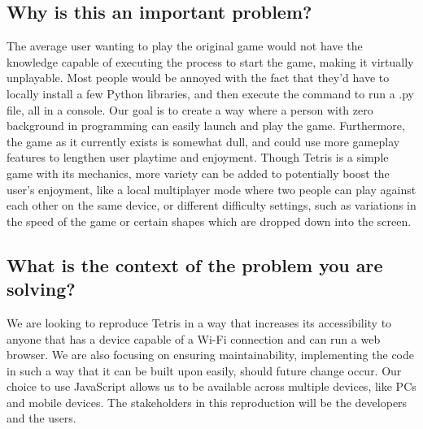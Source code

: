 \documentclass[11pt, oneside]{article}   	%
\begin{document}
\subsection{Why is this an important problem?}

The average user wanting to play the original game would not have the knowledge capable of executing the process to start the game, making it virtually unplayable. Most people would be annoyed with the fact that they’d have to locally install a few Python libraries, and then execute the command to run a .py file, all in a console. Our goal is to create a way where a person with zero background in programming can easily launch and play the game. Furthermore, the game as it currently exists is somewhat dull, and could use more gameplay features to lengthen user playtime and enjoyment. Though Tetris is a simple game with its mechanics, more variety can be added to potentially boost the user’s enjoyment, like a local multiplayer mode where two people can play against each other on the same device, or different difficulty settings, such as variations in the speed of the game or certain shapes which are dropped down into the screen.

\subsection{What is the context of the problem you are solving?}

We are looking to reproduce Tetris in a way that increases its accessibility to anyone that has a device capable of a Wi-Fi connection and can run a web browser. We are also focusing on ensuring maintainability, implementing the code in such a way that it can be built upon easily, should future change occur. Our choice to use JavaScript allows us to be available across multiple devices, like PCs and mobile devices. The stakeholders in this reproduction will be the developers and the users.
\end{document}
